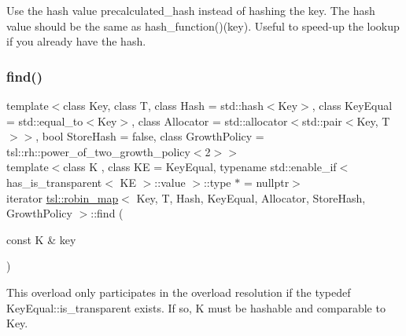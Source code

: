 Use the hash value \textquotesingle{}precalculated\+\_\+hash\textquotesingle{} instead of hashing the key. The hash value should be the same as hash\+\_\+function()(key). Useful to speed-\/up the lookup if you already have the hash. \mbox{\label{classtsl_1_1robin__map_a7ace7db6d815c2b353d6cb590724ceb0}} 
\subsubsection{\texorpdfstring{find()}{find()}\hspace{0.1cm}{\footnotesize\ttfamily [3/6]}}
{\footnotesize\ttfamily template$<$class Key, class T, class Hash = std\+::hash$<$\+Key$>$, class Key\+Equal = std\+::equal\+\_\+to$<$\+Key$>$, class Allocator = std\+::allocator$<$std\+::pair$<$\+Key, T$>$$>$, bool Store\+Hash = false, class Growth\+Policy = tsl\+::rh\+::power\+\_\+of\+\_\+two\+\_\+growth\+\_\+policy$<$2$>$$>$ \\
template$<$class K , class KE  = Key\+Equal, typename std\+::enable\+\_\+if$<$ has\+\_\+is\+\_\+transparent$<$ K\+E $>$\+::value $>$\+::type $\ast$  = nullptr$>$ \\
iterator \mbox{\hyperlink{classtsl_1_1robin__map}{tsl\+::robin\+\_\+map}}$<$ Key, T, Hash, Key\+Equal, Allocator, Store\+Hash, Growth\+Policy $>$\+::find (\begin{DoxyParamCaption}\item[{const K \&}]{key }\end{DoxyParamCaption})\hspace{0.3cm}{\ttfamily [inline]}}

This overload only participates in the overload resolution if the typedef Key\+Equal\+::is\+\_\+transparent exists. If so, K must be hashable and comparable to Key. \mbox{\label{classtsl_1_1robin__map_aff06d18f3090fcd2cd3eeccbf25b5174}} 
